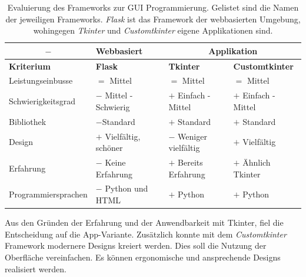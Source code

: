 \begin{table}[H]
    \centering
    \begin{tabular}{l|l|l|l}
        \multicolumn{1}{c|}{$-$}&   \textbf{Webbasiert}&        \multicolumn{2}{c}{\textbf{Applikation}}\\
        \hline
        \textbf{Kriterium}&         \textbf{Flask}&             \textbf{Tkinter}&           \textbf{Customtkinter}\\
        \hline
        Leistungseinbusse&          $=$ Mittel&                 $=$ Mittel&                 $=$ Mittel\\
        Schwierigkeitsgrad&         $-$ Mittel - Schwierig&     $+$ Einfach - Mittel &      $+$ Einfach - Mittel \\
        Bibliothek&                 $-$Standard&                $+$ Standard &              $+$ Standard \\
        Design&                     $+$ Vielfältig, schöner&    $-$ Weniger vielfältig &    $+$ Vielfältig\\
        Erfahrung&                  $-$ Keine Erfahrung&        $+$ Bereits Erfahrung &     $+$ Ähnlich Tkinter\\
        Programmiersprachen&        $-$ Python und HTML&        $+$ Python &                $+$ Python \\
    \end{tabular}
    \caption{Evaluierung des Frameworks zur GUI Programmierung. Gelistet sind die Namen der jeweiligen Frameworks. \textit{Flask} ist das Framework der webbasierten Umgebung, wohingegen \textit{Tkinter} und \textit{Customtkinter} eigene Applikationen sind.}
    \label{tab:gui_programming}
\end{table}

Aus den Gründen der Erfahrung und der Anwendbarkeit mit Tkinter, fiel die Entscheidung auf die App-Variante. Zusätzlich konnte mit dem \textit{Customtkinter} Framework modernere Designs kreiert werden. Dies soll die Nutzung der Oberfläche vereinfachen. Es können ergonomische und ansprechende Designs realisiert werden.

